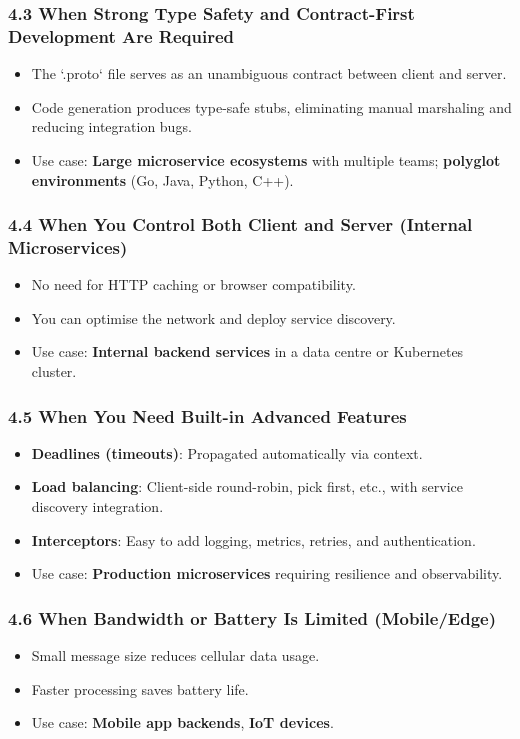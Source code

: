 \documentclass[10pt,a4paper]{article}
\begin{document}
\subsubsection{4.3 When Strong Type Safety and Contract-First Development Are Required}
\begin{itemize}
    \item The `.proto` file serves as an unambiguous contract between client and server.
    \item Code generation produces type-safe stubs, eliminating manual marshaling and reducing integration bugs.
    \item Use case: \textbf{Large microservice ecosystems} with multiple teams; \textbf{polyglot environments} (Go, Java, Python, C++).
\end{itemize}

\subsubsection{4.4 When You Control Both Client and Server (Internal Microservices)}
\begin{itemize}
    \item No need for HTTP caching or browser compatibility.
    \item You can optimise the network and deploy service discovery.
    \item Use case: \textbf{Internal backend services} in a data centre or Kubernetes cluster.
\end{itemize}

\subsubsection{4.5 When You Need Built-in Advanced Features}
\begin{itemize}
    \item \textbf{Deadlines (timeouts)}: Propagated automatically via context.
    \item \textbf{Load balancing}: Client-side round-robin, pick first, etc., with service discovery integration.
    \item \textbf{Interceptors}: Easy to add logging, metrics, retries, and authentication.
    \item Use case: \textbf{Production microservices} requiring resilience and observability.
\end{itemize}

\subsubsection{4.6 When Bandwidth or Battery Is Limited (Mobile/Edge)}
\begin{itemize}
    \item Small message size reduces cellular data usage.
    \item Faster processing saves battery life.
    \item Use case: \textbf{Mobile app backends}, \textbf{IoT devices}.
\end{itemize}
\end{document}
